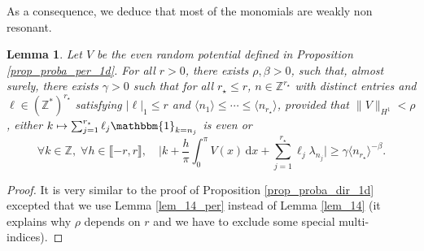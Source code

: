 \documentclass[JEP,XML,SOM,Unicode,NoEqCountersInSection,published]{cedram}
\newcommand\mto{\mathchoice{\longmapsto}{\mapsto}{\mapsto}{\mapsto}}
\newtheorem{lemma}[theorem]{Lemma}
\theoremstyle{definition}
\begin{document}
As a consequence, we deduce that most of the monomials are weakly non resonant.
\begin{lemma}
\label{lem_per_nonevenok} Let $V$ be the even random potential defined in Proposition \ref{prop_proba_per_1d}. For all $r>0$, there exists $\rho,\beta>0$, such that, almost surely, there exists $\gamma>0$ such that for all $r_\star \leq r$, $n\in \mathbb{Z}^{r_\star}$ with distinct entries and $\ell \in (\mathbb{Z}^*)^{r_\star}$ satisfying $|\ell|_1 \leq r$ and $\langle n_1 \rangle \leq \cdots \leq \langle n_{r_\star} \rangle$, provided that $\| V\|_{H^1} < \rho$, either $ k \mto \sum_{j=1}^{r_\star} \ell_j \mathbbm{1}_{ k = n_j } $ is even or
\[
\forall k\in \mathbb{Z},\; \forall h\in \llbracket -r,r \rrbracket, \quad \biggl |k+\frac{h}\pi \int_0^\pi V(x) \, \mathrm{d}x + \sum_{j=1}^{r_\star} \ell_j \lambda_{n_j} \biggr|\geq \gamma \langle n_{r_\star} \rangle^{-\beta}.
\]
\end{lemma}
\begin{proof} It is very similar to the proof of Proposition \ref{prop_proba_dir_1d} excepted that we use Lemma \ref{lem_14_per} instead of Lemma \ref{lem_14} (it explains why $\rho$ depends on $r$ and we have to exclude some special multi-indices).
\end{proof}
\end{document}
